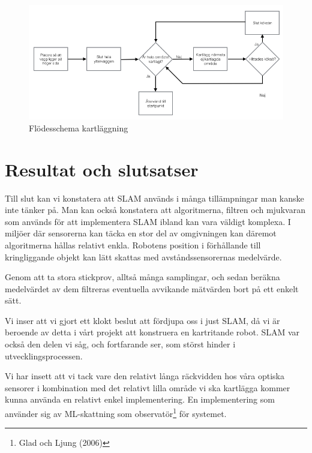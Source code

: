 \documentclass[a4paper,12pt,fleqn]{article}
\begin{document}
\begin{figure}[htp] %
  \begin{center}
  \includegraphics[keepaspectratio=true,scale=0.5]{../../Designspec/Flode_kartritning.jpg}  %
  \end{center}
  \caption{Flödesschema kartläggning} %
  \label{fig:algoritm} %
\end{figure}

\newpage
\section{Resultat och slutsatser}

Till slut kan vi konstatera att SLAM används i många tillämpningar man kanske inte tänker på. Man kan också konstatera att algoritmerna, filtren och mjukvaran som används för att implementera SLAM ibland kan vara väldigt komplexa. I miljöer där sensorerna kan täcka en stor del av omgivningen kan däremot algoritmerna hållas relativt enkla. Robotens position i förhållande till kringliggande objekt kan lätt skattas med avståndssensorernas medelvärde. 

Genom att ta stora stickprov, alltså många samplingar, och sedan beräkna medelvärdet av dem filtreras eventuella avvikande mätvärden bort på ett enkelt sätt. 

Vi inser att vi gjort ett klokt beslut att fördjupa oss i just SLAM, då vi är beroende av detta i vårt projekt att konstruera en kartritande robot. SLAM var också den delen vi såg, och fortfarande ser, som störst hinder i utvecklingsprocessen. 

Vi har insett att vi tack vare den relativt långa räckvidden hos våra optiska sensorer i kombination med det relativt lilla område vi ska kartlägga kommer kunna använda en relativt enkel implementering. En implementering som använder sig av ML-skattning som observatör\footnote{Glad och Ljung (2006)} för systemet. 
\end{document}
